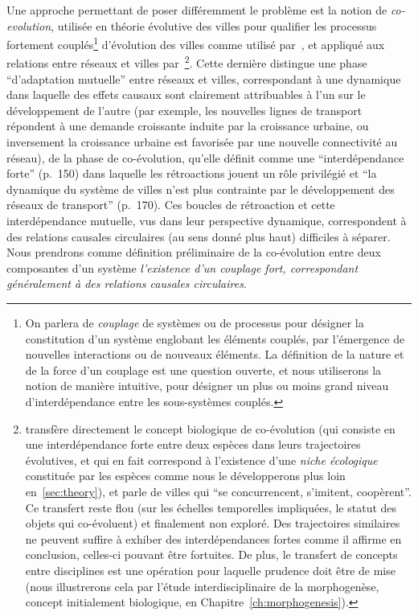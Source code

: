 {}{
Une approche permettant de poser différemment le problème est la notion de \emph{co-evolution}, utilisée en théorie évolutive des villes pour qualifier les processus fortement couplés\footnote{On parlera de \emph{couplage} de systèmes ou de processus pour désigner la constitution d'un système englobant les éléments couplés, par l'émergence de nouvelles interactions ou de nouveaux éléments. La définition de la nature et de la force d'un couplage est une question ouverte, et nous utiliserons la notion de manière intuitive, pour désigner un plus ou moins grand niveau d'interdépendance entre les sous-systèmes couplés.} d'évolution des villes comme utilisé par~\cite{paulus2004coevolution}, et appliqué aux relations entre réseaux et villes par~\cite{bretagnolle:tel-00459720}\footnote{\cite{paulus2004coevolution} transfère directement le concept biologique de co-évolution (qui consiste en une interdépendance forte entre deux espèces dans leurs trajectoires évolutives, et qui en fait correspond à l'existence d'une \emph{niche écologique} constituée par les espèces comme nous le développerons plus loin en~\ref{sec:theory}), et parle de villes qui ``se concurrencent, s'imitent, coopèrent''. Ce transfert reste flou (sur les échelles temporelles impliquées, le statut des objets qui co-évoluent) et finalement non exploré. Des trajectoires similaires ne peuvent suffire à exhiber des interdépendances fortes comme il affirme en conclusion, celles-ci pouvant être fortuites. De plus, le transfert de concepts entre disciplines est une opération pour laquelle prudence doit être de mise (nous illustrerons cela par l'étude interdisciplinaire de la morphogenèse, concept initialement biologique, en Chapitre~\ref{ch:morphogenesis}).}. Cette dernière distingue une phase ``d'adaptation mutuelle'' entre réseaux et villes, correspondant à une dynamique dans laquelle des effets causaux sont clairement attribuables à l'un sur le développement de l'autre (par exemple, les nouvelles lignes de transport répondent à une demande croissante induite par la croissance urbaine, ou inversement la croissance urbaine est favorisée par une nouvelle connectivité au réseau), de la phase de co-évolution, qu'elle définit comme une ``interdépendance forte'' (p.~150) dans laquelle les rétroactions jouent un rôle privilégié  et ``la dynamique du système de villes n'est plus contrainte par le développement des réseaux de transport'' (p.~170). Ces boucles de rétroaction et cette interdépendance mutuelle, vus dans leur perspective dynamique, correspondent à des relations causales circulaires (au sens donné plus haut) difficiles à séparer. Nous prendrons comme définition préliminaire de la co-évolution entre deux composantes d'un système \emph{l'existence d'un couplage fort, correspondant généralement à des relations causales circulaires}.
}

